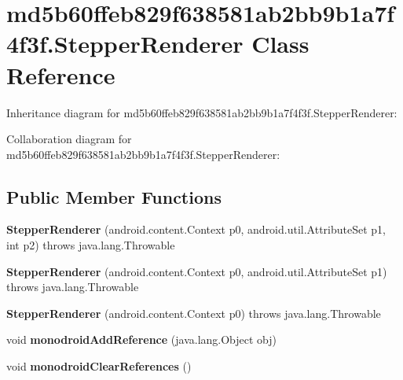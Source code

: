 \hypertarget{classmd5b60ffeb829f638581ab2bb9b1a7f4f3f_1_1_stepper_renderer}{}\section{md5b60ffeb829f638581ab2bb9b1a7f4f3f.\+Stepper\+Renderer Class Reference}
\label{classmd5b60ffeb829f638581ab2bb9b1a7f4f3f_1_1_stepper_renderer}


Inheritance diagram for md5b60ffeb829f638581ab2bb9b1a7f4f3f.\+Stepper\+Renderer\+:


Collaboration diagram for md5b60ffeb829f638581ab2bb9b1a7f4f3f.\+Stepper\+Renderer\+:
\subsection*{Public Member Functions}
\begin{DoxyCompactItemize}
\item 
\mbox{\label{classmd5b60ffeb829f638581ab2bb9b1a7f4f3f_1_1_stepper_renderer_a2ef88542d6857f04d735dda737d2dce5}} 
{\bfseries Stepper\+Renderer} (android.\+content.\+Context p0, android.\+util.\+Attribute\+Set p1, int p2)  throws java.\+lang.\+Throwable 	
\item 
\mbox{\label{classmd5b60ffeb829f638581ab2bb9b1a7f4f3f_1_1_stepper_renderer_afe7aea890375adfb8ffdd5ac53251bf3}} 
{\bfseries Stepper\+Renderer} (android.\+content.\+Context p0, android.\+util.\+Attribute\+Set p1)  throws java.\+lang.\+Throwable 	
\item 
\mbox{\label{classmd5b60ffeb829f638581ab2bb9b1a7f4f3f_1_1_stepper_renderer_a990efbc9f4d9a90ef0b0ffdf69560899}} 
{\bfseries Stepper\+Renderer} (android.\+content.\+Context p0)  throws java.\+lang.\+Throwable 	
\item 
\mbox{\label{classmd5b60ffeb829f638581ab2bb9b1a7f4f3f_1_1_stepper_renderer_a772f7be0ba769c29dffe9b37cca95502}} 
void {\bfseries monodroid\+Add\+Reference} (java.\+lang.\+Object obj)
\item 
\mbox{\label{classmd5b60ffeb829f638581ab2bb9b1a7f4f3f_1_1_stepper_renderer_a47b2498d2f24016154368d5bb6dd5843}} 
void {\bfseries monodroid\+Clear\+References} ()
\end{DoxyCompactItemize}
